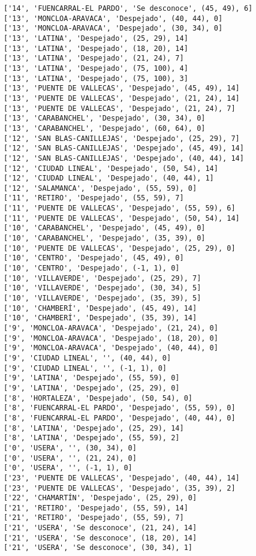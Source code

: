 \documentclass[11pt]{article}
\begin{document}
\begin{Verbatim}[commandchars=\\\{\}]
['14', 'FUENCARRAL-EL PARDO', 'Se desconoce', (45, 49), 6]
['13', 'MONCLOA-ARAVACA', 'Despejado', (40, 44), 0]
['13', 'MONCLOA-ARAVACA', 'Despejado', (30, 34), 0]
['13', 'LATINA', 'Despejado', (25, 29), 14]
['13', 'LATINA', 'Despejado', (18, 20), 14]
['13', 'LATINA', 'Despejado', (21, 24), 7]
['13', 'LATINA', 'Despejado', (75, 100), 4]
['13', 'LATINA', 'Despejado', (75, 100), 3]
['13', 'PUENTE DE VALLECAS', 'Despejado', (45, 49), 14]
['13', 'PUENTE DE VALLECAS', 'Despejado', (21, 24), 14]
['13', 'PUENTE DE VALLECAS', 'Despejado', (21, 24), 7]
['13', 'CARABANCHEL', 'Despejado', (30, 34), 0]
['13', 'CARABANCHEL', 'Despejado', (60, 64), 0]
['12', 'SAN BLAS-CANILLEJAS', 'Despejado', (25, 29), 7]
['12', 'SAN BLAS-CANILLEJAS', 'Despejado', (45, 49), 14]
['12', 'SAN BLAS-CANILLEJAS', 'Despejado', (40, 44), 14]
['12', 'CIUDAD LINEAL', 'Despejado', (50, 54), 14]
['12', 'CIUDAD LINEAL', 'Despejado', (40, 44), 1]
['12', 'SALAMANCA', 'Despejado', (55, 59), 0]
['11', 'RETIRO', 'Despejado', (55, 59), 7]
['11', 'PUENTE DE VALLECAS', 'Despejado', (55, 59), 6]
['11', 'PUENTE DE VALLECAS', 'Despejado', (50, 54), 14]
['10', 'CARABANCHEL', 'Despejado', (45, 49), 0]
['10', 'CARABANCHEL', 'Despejado', (35, 39), 0]
['10', 'PUENTE DE VALLECAS', 'Despejado', (25, 29), 0]
['10', 'CENTRO', 'Despejado', (45, 49), 0]
['10', 'CENTRO', 'Despejado', (-1, 1), 0]
['10', 'VILLAVERDE', 'Despejado', (25, 29), 7]
['10', 'VILLAVERDE', 'Despejado', (30, 34), 5]
['10', 'VILLAVERDE', 'Despejado', (35, 39), 5]
['10', 'CHAMBERÍ', 'Despejado', (45, 49), 14]
['10', 'CHAMBERÍ', 'Despejado', (35, 39), 14]
['9', 'MONCLOA-ARAVACA', 'Despejado', (21, 24), 0]
['9', 'MONCLOA-ARAVACA', 'Despejado', (18, 20), 0]
['9', 'MONCLOA-ARAVACA', 'Despejado', (40, 44), 0]
['9', 'CIUDAD LINEAL', '', (40, 44), 0]
['9', 'CIUDAD LINEAL', '', (-1, 1), 0]
['9', 'LATINA', 'Despejado', (55, 59), 0]
['9', 'LATINA', 'Despejado', (25, 29), 0]
['8', 'HORTALEZA', 'Despejado', (50, 54), 0]
['8', 'FUENCARRAL-EL PARDO', 'Despejado', (55, 59), 0]
['8', 'FUENCARRAL-EL PARDO', 'Despejado', (40, 44), 0]
['8', 'LATINA', 'Despejado', (25, 29), 14]
['8', 'LATINA', 'Despejado', (55, 59), 2]
['0', 'USERA', '', (30, 34), 0]
['0', 'USERA', '', (21, 24), 0]
['0', 'USERA', '', (-1, 1), 0]
['23', 'PUENTE DE VALLECAS', 'Despejado', (40, 44), 14]
['23', 'PUENTE DE VALLECAS', 'Despejado', (35, 39), 2]
['22', 'CHAMARTÍN', 'Despejado', (25, 29), 0]
['21', 'RETIRO', 'Despejado', (55, 59), 14]
['21', 'RETIRO', 'Despejado', (55, 59), 7]
['21', 'USERA', 'Se desconoce', (21, 24), 14]
['21', 'USERA', 'Se desconoce', (18, 20), 14]
['21', 'USERA', 'Se desconoce', (30, 34), 1]

\end{Verbatim}
\end{document}
